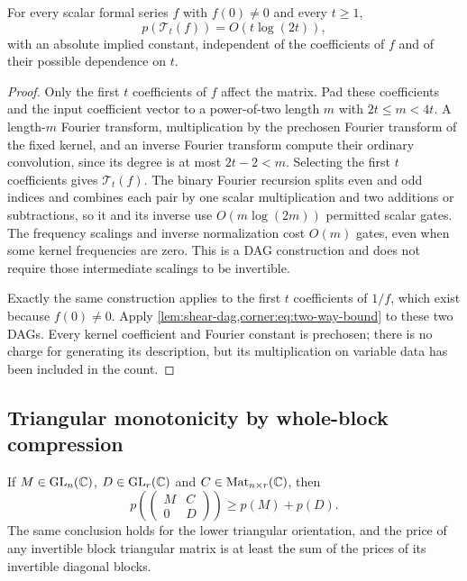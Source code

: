 \begin{lemma}
\label{lem:scalar-convolution}
For every scalar formal series $f$ with $f(0)\ne0$ and every $t\ge1$,
\[
 p(\mathcal T_t(f))=O(t\log(2t)),
\]
with an absolute implied constant, independent of the coefficients of
$f$ and of their possible dependence on $t$.
\end{lemma}

\begin{proof}
Only the first $t$ coefficients of $f$ affect the matrix.  Pad these
coefficients and the input coefficient vector to a power-of-two length
$m$ with $2t\le m<4t$.  A length-$m$ Fourier transform, multiplication
by the prechosen Fourier transform of the fixed kernel, and an inverse
Fourier transform compute their ordinary convolution, since its degree
is at most $2t-2<m$.  Selecting the first $t$ coefficients gives
$\mathcal T_t(f)$.  The binary Fourier recursion splits even and odd
indices and combines each pair by one scalar multiplication and two
additions or subtractions, so it and its inverse use
$O(m\log(2m))$ permitted scalar gates.  The frequency scalings and
inverse normalization cost $O(m)$ gates, even when some kernel
frequencies are zero.  This is a DAG construction and does not require
those intermediate scalings to be invertible.

Exactly the same construction applies to the first $t$ coefficients
of $1/f$, which exist because $f(0)\ne0$.  Apply
\cref{lem:shear-dag,corner:eq:two-way-bound} to these two DAGs.
Every kernel coefficient and Fourier constant is prechosen; there is
no charge for generating its description, but its multiplication on
variable data has been included in the count.
\end{proof}

\subsection{Triangular monotonicity by whole-block compression}

\begin{lemma}
\label{lem:triangular}
If $M\in\operatorname{GL}_n(\mathbb C)$, $D\in\operatorname{GL}_r(\mathbb C)$ and
$C\in\operatorname{Mat}_{n\times r}(\mathbb C)$, then
\begin{equation}
 p\left(\begin{pmatrix}M&C\\0&D\end{pmatrix}\right)
 \ge p(M)+p(D).
 \label{corner:eq:triangular}
\end{equation}
The same conclusion holds for the lower triangular orientation, and
the price of any invertible block triangular matrix is at least the
sum of the prices of its invertible diagonal blocks.
\end{lemma}

